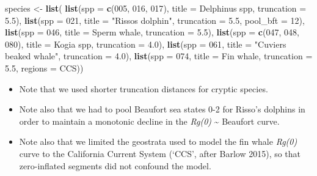 \documentclass[
]{book}
\newenvironment{Shaded}{\begin{snugshade}}{\end{snugshade}}
\newcommand{\AttributeTok}[1]{\textcolor[rgb]{0.13,0.29,0.53}{#1}}
\newcommand{\FloatTok}[1]{\textcolor[rgb]{0.00,0.00,0.81}{#1}}
\newcommand{\FunctionTok}[1]{\textcolor[rgb]{0.13,0.29,0.53}{\textbf{#1}}}
\newcommand{\NormalTok}[1]{#1}
\newcommand{\OtherTok}[1]{\textcolor[rgb]{0.56,0.35,0.01}{#1}}
\newcommand{\StringTok}[1]{\textcolor[rgb]{0.31,0.60,0.02}{#1}}
\begin{document}
\begin{Shaded}
\begin{Highlighting}[]
\NormalTok{species }\OtherTok{\textless{}{-}} \FunctionTok{list}\NormalTok{(}
  \FunctionTok{list}\NormalTok{(}\AttributeTok{spp =} \FunctionTok{c}\NormalTok{(}\StringTok{\textquotesingle{}005\textquotesingle{}}\NormalTok{, }\StringTok{\textquotesingle{}016\textquotesingle{}}\NormalTok{, }\StringTok{\textquotesingle{}017\textquotesingle{}}\NormalTok{),}
       \AttributeTok{title =} \StringTok{\textquotesingle{}Delphinus spp\textquotesingle{}}\NormalTok{,}
       \AttributeTok{truncation =} \FloatTok{5.5}\NormalTok{),}
  \FunctionTok{list}\NormalTok{(}\AttributeTok{spp =} \StringTok{\textquotesingle{}021\textquotesingle{}}\NormalTok{,}
       \AttributeTok{title =} \StringTok{"Risso\textquotesingle{}s dolphin"}\NormalTok{,}
       \AttributeTok{truncation =} \FloatTok{5.5}\NormalTok{, }
       \AttributeTok{pool\_bft =} \StringTok{\textquotesingle{}12\textquotesingle{}}\NormalTok{),}
  \FunctionTok{list}\NormalTok{(}\AttributeTok{spp =} \StringTok{\textquotesingle{}046\textquotesingle{}}\NormalTok{,}
       \AttributeTok{title =} \StringTok{\textquotesingle{}Sperm whale\textquotesingle{}}\NormalTok{,}
       \AttributeTok{truncation =} \FloatTok{5.5}\NormalTok{),}
  \FunctionTok{list}\NormalTok{(}\AttributeTok{spp =} \FunctionTok{c}\NormalTok{(}\StringTok{\textquotesingle{}047\textquotesingle{}}\NormalTok{, }\StringTok{\textquotesingle{}048\textquotesingle{}}\NormalTok{, }\StringTok{\textquotesingle{}080\textquotesingle{}}\NormalTok{),}
       \AttributeTok{title =} \StringTok{\textquotesingle{}Kogia spp\textquotesingle{}}\NormalTok{,}
       \AttributeTok{truncation =} \FloatTok{4.0}\NormalTok{),}
  \FunctionTok{list}\NormalTok{(}\AttributeTok{spp =} \StringTok{\textquotesingle{}061\textquotesingle{}}\NormalTok{,}
       \AttributeTok{title =} \StringTok{"Cuvier\textquotesingle{}s beaked whale"}\NormalTok{,}
       \AttributeTok{truncation =} \FloatTok{4.0}\NormalTok{),}
  \FunctionTok{list}\NormalTok{(}\AttributeTok{spp =} \StringTok{\textquotesingle{}074\textquotesingle{}}\NormalTok{,}
       \AttributeTok{title =} \StringTok{\textquotesingle{}Fin whale\textquotesingle{}}\NormalTok{,}
       \AttributeTok{truncation =} \FloatTok{5.5}\NormalTok{,}
       \AttributeTok{regions =} \StringTok{\textquotesingle{}CCS\textquotesingle{}}\NormalTok{))}
\end{Highlighting}
\end{Shaded}

\begin{itemize}
\item
  Note that we used shorter truncation distances for cryptic species.
\item
  Note also that we had to pool Beaufort sea states 0-2 for Risso's dolphins in order to maintain a monotonic decline in the \emph{Rg(0)} \textasciitilde{} Beaufort curve.
\item
  Note also that we limited the geostrata used to model the fin whale \emph{Rg(0)} curve to the California Current System (`CCS', after Barlow 2015), so that zero-inflated segments did not confound the model.
\end{itemize}
\end{document}
